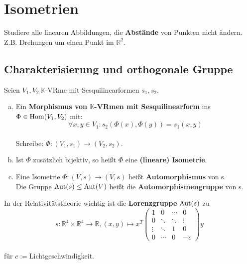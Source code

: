 \documentclass[parskip,a4paper,twoside,DIV15,BCOR12mm]{scrbook}
\begin{document}
\chapter{Isometrien}

\begin{task}
Studiere alle linearen Abbildungen, die \textbf{Abstände} von Punkten nicht ändern.
Z.B. Drehungen um einen Punkt im $\mathbb{R}^2$.
\end{task}

\section{Charakterisierung und orthogonale Gruppe}
\begin{definition}
Seien $V_1,V_2\ \mathbb{K}$-VRme mit Sesquilinearformen $s_1,s_2$.
\begin{enumerate}[(a)]
\item Ein \textbf{Morphismus von $\mathbb{K}$-VRmen mit Sesquilinearform} ins
$\Phi\in \operatorname{Hom}(V_1,V_2)$ mit:\\
\[\forall x,y\in V_1:s_2(\Phi(x),\Phi(y))=s_1(x,y)\]\\
Schreibe: $\Phi:(V_1,s_1)\to (V_2,s_2)$.
\item Ist $\Phi$ zusätzlich bijektiv, so heißt $\Phi$ eine \textbf{(lineare) Isometrie}.
\item Eine Isometrie $\Phi:(V,s)\to (V,s)$ heißt \textbf{Automorphismus} von s.\\
Die Gruppe $\operatorname{Aut}(s)\le\operatorname{Aut}(V)$ heißt die \textbf{Automorphismengruppe} von s.
\end{enumerate}
\end{definition}

\begin{example}
In der Relativitätstheorie wichtig ist die \textbf{Lorenzgruppe} $\operatorname{Aut}(s)$ zu\\
\[s:\mathbb{R}^4 \times \mathbb{R}^4 \to\mathbb{R}, (x,y)\mapsto x^T
\begin{pmatrix}
1&0&\cdots&0\\
0&\ddots&\ddots&\vdots\\
\vdots&\ddots&1&0\\
0&\cdots&0&-c
\end{pmatrix}
y\]\\ 
für $c:=$Lichtgeschwindigkeit.
\end{example}
\end{document}

